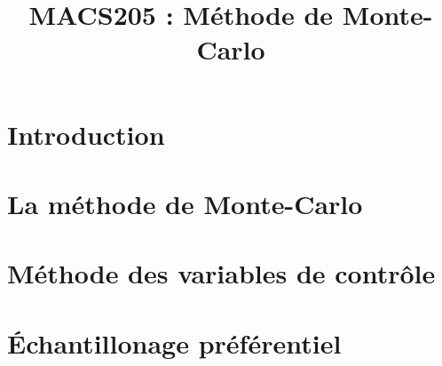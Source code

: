 \documentclass[a4paper,12pt]{article}
\title{\vspace{-1.2cm} \textbf{MACS205 : Méthode de Monte-Carlo}}
\begin{document}
\maketitle

\vspace{-1.5cm}


\section{Introduction}
	

\section{La méthode de Monte-Carlo}
	

\section{Méthode des variables de contrôle}
	

\section{Échantillonage préférentiel}
	
\end{document}
